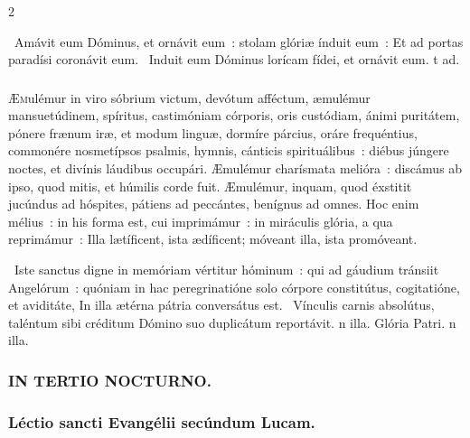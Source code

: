 \documentclass[9pt,twoside]{extarticle}
\begin{document}
\begin{multicols}{2}
\begin{tightlist}{}
\item {}~Amávit eum Dóminus, et ornávit eum~: stolam glóriæ índuit eum~: \textred{*} Et ad portas paradísi coronávit eum. ~Induit eum Dóminus lorícam fídei, et ornávit eum. t ad.
\end{tightlist}

\subsubsection*{\center{}}
\lettrine{Æ}mulémur in viro sóbrium victum, devótum afféctum, æmulémur mansuetúdinem, spíritus, castimóniam córporis, oris custódiam, ánimi puritátem, pónere frænum iræ, et modum linguæ, dormíre párcius, oráre frequéntius, commonére nosmetípsos psalmis, hymnis, cánticis spirituálibus~: diébus júngere noctes, et divínis láudibus occupári. Æmulémur charísmata melióra~: discámus ab ipso, quod mitis, et húmilis corde fuit. Æmulémur, inquam, quod éxstitit jucúndus ad hóspites, pátiens ad peccántes, benígnus ad omnes. Hoc enim mélius~: in his forma est, cui imprimámur~: in miráculis glória, a qua reprimámur~: Illa lætíficent, ista ædíficent; móveant illa, ista promóveant.

\begin{tightlist}{}
\item {}~Iste sanctus digne in memóriam vértitur hóminum~: qui ad gáudium tránsiit Angelórum~: quóniam in hac peregrinatióne solo córpore constitútus, cogitatióne, et aviditáte, \textred{*} In illa ætérna pátria conversátus est. ~Vínculis carnis absolútus, taléntum sibi créditum Dómino suo duplicátum reportávit. n illa. Glória Patri. n illa.
\end{tightlist}

\subsubsection*{\center \textsc{IN TERTIO NOCTURNO.}}
\subsubsection*{\center Léctio sancti Evangélii secúndum Lucam.}
\subsubsection*{\center {}}


\end{multicols}
\end{document}
